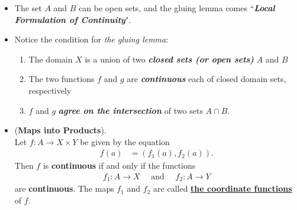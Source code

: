 \documentclass[11pt]{article}
\begin{document}
\begin{itemize}
\item \begin{remark}
The set $A$ and $B$ can be open sets, and the gluing lemma comes ``\emph{\textbf{Local Formulation of Continuity}}".
\end{remark}

\item \begin{remark}
Notice the condition for \emph{the gluing lemma}:
\begin{enumerate}
\item The domain $X$ is a union of two \emph{\textbf{closed sets (or open sets)}} $A$ and $B$
\item The two functions $f$ and $g$ are \emph{\textbf{continuous}} each of closed domain sets, respectively
\item $f$ and $g$ \emph{\textbf{agree on the intersection}} of two sets $A \cap B$.
\end{enumerate}
\end{remark}

\item \begin{theorem} (\textbf{Maps into Products}). \citep{munkres2000topology}\\
Let $f : A \rightarrow X \times Y$ be given by the equation
\begin{align*}
f(a)  &= (f_1(a), f_2(a)).
\end{align*} Then $f$ is \textbf{continuous} if and only if the functions
\begin{align*}
f_1: A \rightarrow X\quad \text{ and }\quad f_2: A \rightarrow Y
\end{align*} 
are \textbf{continuous}. The maps $f_1$ and $f_2$ are called \underline{\textbf{the coordinate functions}} of $f$.
\end{theorem}
\end{itemize}
\end{document}
